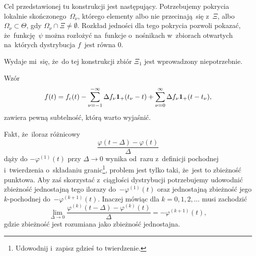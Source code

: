 \documentclass[a4paper,11pt]{article}
\begin{document}
\start {} Cel przedstawionej tu konstrukcji jest następujący.
Potrzebujemy pokrycia lokalnie skończonego~$\Omega_{ \nu }$, którego
elementy albo nie przecinają~się z~$\Xi$, albo
$\Omega_{ \nu } \subset \Theta$, gdy $\Omega_{ \nu } \cap \Xi \neq \emptyset$.
Rozkład jedności dla tego pokrycia pozwoli pokazać, że~funkcję~$\psi$
można rozłożyć na~funkcje o~nośnikach w~zbiorach otwartych na~których
dystrybucja $f$~jest równa $0$.

Wydaje mi~się, że~do tej konstrukcji zbiór $\Xi_{ 1 }$ jest
wprowadzony niepotrzebnie.

\vspace{\spaceFour}



\start {}

\vspace{\spaceFour}



\start {}

\vspace{\spaceFour}



\start {} Wzór
\begin{equation}
  \label{eq:Zem-s01-07}
  f( t ) =
  f_{ c }( t )
  - \sum_{ \nu = -1 }^{ -\infty } \Delta f_{ \nu } \mathbf{1}_{ + }( t_{ \nu } - t )
  + \sum_{ \nu = 0 }^{ \infty } \Delta f_{ \nu } \mathbf{1}_{ + }( t - t_{ \nu } ),
\end{equation}
zawiera pewną subtelność, którą warto wyjaśnić. \Dok

\vspace{\spaceFour}



\start {} Fakt, że~iloraz różnicowy
\begin{equation}
  \label{eq:Zem-s01-08}
  \frac{ \varphi( t - \Delta ) - \varphi( t ) }{ \Delta }
\end{equation}
dąży do $-\varphi^{ ( 1 ) }( t )$ przy $\Delta \to 0$ wynika od~razu z~definicji
pochodnej i~twierdzenia o~składaniu granic\footnote{Udowodnij i~zapisz
  gdzieś to twierdzenie.}, problem jest tylko taki, że~jest to
zbieżność punktowa. Aby zaś skorzystać z~ciągłości dystrybucji
potrzebujemy udowodnić zbieżność jednostajną tego ilorazy
do~$-\varphi^{ ( 1 ) }( t )$ oraz jednostajną zbieżność jego $k$-pochodnej
do~$-\varphi^{ ( k + 1 ) }( t )$. Inaczej mówiąc dla $k = 0, 1, 2, \ldots$
musi zachodzić
\begin{equation}
  \label{eq:Zem-s01-09}
  \lim_{ \Delta \to 0 }
  \frac{ \varphi^{ ( k ) }( t - \Delta ) - \varphi^{ ( k ) }( t ) }{ \Delta }
  = -\varphi^{ ( k + 1 ) }( t ),
\end{equation}
gdzie zbieżność jest rozumiana jako zbieżność jednostajna.
\end{document}
